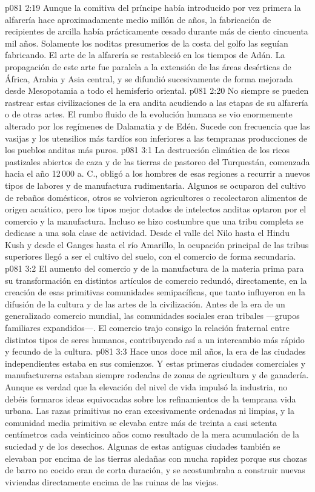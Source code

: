 \vs p081 2:19 Aunque la comitiva del príncipe había introducido por vez primera la alfarería hace aproximadamente medio millón de años, la fabricación de recipientes de arcilla había prácticamente cesado durante más de ciento cincuenta mil años. Solamente los noditas presumerios de la costa del golfo las seguían fabricando. El arte de la alfarería se restableció en los tiempos de Adán. La propagación de este arte fue paralela a la extensión de las áreas desérticas de África, Arabia y Asia central, y se difundió sucesivamente de forma mejorada desde Mesopotamia a todo el hemisferio oriental.
\vs p081 2:20 No siempre se pueden rastrear estas civilizaciones de la era andita acudiendo a las etapas de su alfarería o de otras artes. El rumbo fluido de la evolución humana se vio enormemente alterado por los regímenes de Dalamatia y de Edén. Sucede con frecuencia que las vasijas y los utensilios más tardíos son inferiores a las tempranas producciones de los pueblos anditas más puros.
\vs p081 3:1 La destrucción climática de los ricos pastizales abiertos de caza y de las tierras de pastoreo del Turquestán, comenzada hacia el año 12\,000 a. C., obligó a los hombres de esas regiones a recurrir a nuevos tipos de labores y de manufactura rudimentaria. Algunos se ocuparon del cultivo de rebaños domésticos, otros se volvieron agricultores o recolectaron alimentos de origen acuático, pero los tipos mejor dotados de intelectos anditas optaron por el comercio y la manufactura. Incluso se hizo costumbre que una tribu completa se dedicase a una sola clase de actividad. Desde el valle del Nilo hasta el Hindu Kush y desde el Ganges hasta el río Amarillo, la ocupación principal de las tribus superiores llegó a ser el cultivo del suelo, con el comercio de forma secundaria.
\vs p081 3:2 El aumento del comercio y de la manufactura de la materia prima para su transformación en distintos artículos de comercio redundó, directamente, en la creación de esas primitivas comunidades semipacíficas, que tanto influyeron en la difusión de la cultura y de las artes de la civilización. Antes de la era de un generalizado comercio mundial, las comunidades sociales eran tribales ---grupos familiares expandidos---. El comercio trajo consigo la relación fraternal entre distintos tipos de seres humanos, contribuyendo así a un intercambio más rápido y fecundo de la cultura.
\vs p081 3:3 Hace unos doce mil años, la era de las ciudades independientes estaba en sus comienzos. Y estas primeras ciudades comerciales y manufactureras estaban siempre rodeadas de zonas de agricultura y de ganadería. Aunque es verdad que la elevación del nivel de vida impulsó la industria, no debéis formaros ideas equivocadas sobre los refinamientos de la temprana vida urbana. Las razas primitivas no eran excesivamente ordenadas ni limpias, y la comunidad media primitiva se elevaba entre más de treinta a casi setenta centímetros cada veinticinco años como resultado de la mera acumulación de la suciedad y de los desechos. Algunas de estas antiguas ciudades también se elevaban por encima de las tierras aledañas con mucha rapidez porque sus chozas de barro no cocido eran de corta duración, y se acostumbraba a construir nuevas viviendas directamente encima de las ruinas de las viejas.
